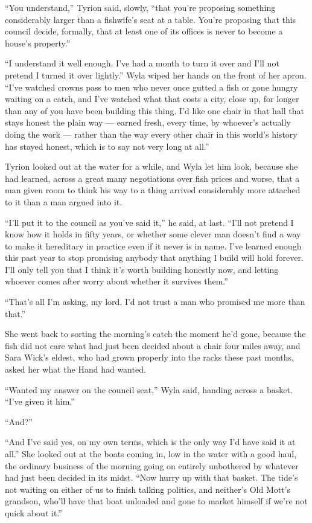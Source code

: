 \sceneBreak

“You understand,” Tyrion said, slowly, “that you’re proposing something considerably larger than a fishwife’s seat at a table. You’re proposing that this council decide, formally, that at least one of its offices is never to become a house’s property.”

“I understand it well enough. I’ve had a month to turn it over and I’ll not pretend I turned it over lightly.” Wyla wiped her hands on the front of her apron. “I’ve watched crowns pass to men who never once gutted a fish or gone hungry waiting on a catch, and I’ve watched what that costs a city, close up, for longer than any of you have been building this thing. I’d like one chair in that hall that stays honest the plain way — earned fresh, every time, by whoever’s actually doing the work — rather than the way every other chair in this world’s history has stayed honest, which is to say not very long at all.”

\sceneBreak

Tyrion looked out at the water for a while, and Wyla let him look, because she had learned, across a great many negotiations over fish prices and worse, that a man given room to think his way to a thing arrived considerably more attached to it than a man argued into it.

“I’ll put it to the council as you’ve said it,” he said, at last. “I’ll not pretend I know how it holds in fifty years, or whether some clever man doesn’t find a way to make it hereditary in practice even if it never is in name. I’ve learned enough this past year to stop promising anybody that anything I build will hold forever. I’ll only tell you that I think it’s worth building honestly now, and letting whoever comes after worry about whether it survives them.”

“That’s all I’m asking, my lord. I’d not trust a man who promised me more than that.”

\sceneBreak

She went back to sorting the morning’s catch the moment he’d gone, because the fish did not care what had just been decided about a chair four miles away, and Sara Wick’s eldest, who had grown properly into the racks these past months, asked her what the Hand had wanted.

“Wanted my answer on the council seat,” Wyla said, handing across a basket. “I’ve given it him.”

“And?”

“And I’ve said yes, on my own terms, which is the only way I’d have said it at all.” She looked out at the boats coming in, low in the water with a good haul, the ordinary business of the morning going on entirely unbothered by whatever had just been decided in its midst. “Now hurry up with that basket. The tide’s not waiting on either of us to finish talking politics, and neither’s Old Mott’s grandson, who’ll have that boat unloaded and gone to market himself if we’re not quick about it.”